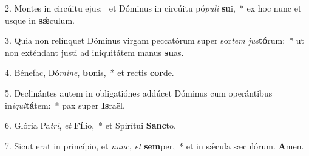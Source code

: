 2. Montes in circúitu ejus: \dag\  et Dóminus in circúitu pó\textit{pu}\textit{li} \textbf{su}i,~*  ex hoc nunc et usque in \textbf{sǽ}culum.\

3. Quia non relínquet Dóminus virgam peccatórum super sor\textit{tem} \textit{jus}\textbf{tó}rum:~*  ut non exténdant justi ad iniquitátem manus \textbf{su}as.\

4. Bénefac, Dó\textit{mi}\textit{ne}, \textbf{bo}nis,~*  et rectis \textbf{cor}de.\

5. Declinántes autem in obligatiónes addúcet Dóminus cum operántibus in\textit{i}\textit{qui}\textbf{tá}tem:~*  pax super \textbf{Is}raël.\

6. Glória Pa\textit{tri}, \textit{et} \textbf{Fí}lio,~*  et Spirítui \textbf{Sanc}to.\

7. Sicut erat in princípio, et \textit{nunc}, \textit{et} \textbf{sem}per,~*  et in sǽcula sæculórum. \textbf{A}men.\

